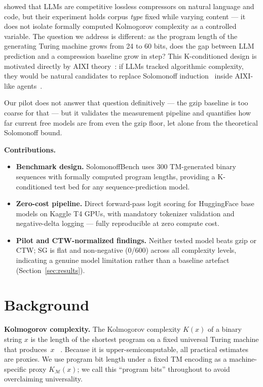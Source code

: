\documentclass{article}
\begin{document}
\citet{deletang2023language} showed that LLMs are competitive lossless
compressors on natural language and code, but their experiment holds
corpus \emph{type} fixed while varying content — it does not isolate
formally computed Kolmogorov complexity as a controlled variable.
The question we address is different: as the program length of the
generating Turing machine grows from 24 to 60 bits, does the gap between
LLM prediction and a compression baseline grow in step?
This K-conditioned design is motivated directly by AIXI
theory~\citep{hutter2000aixi,hutter2007universal}: if LLMs tracked
algorithmic complexity, they would be natural candidates to replace
Solomonoff induction~\citep{solomonoff1964formal} inside AIXI-like
agents~\citep{legg2007universal}.

Our pilot does not answer that question definitively — the gzip baseline
is too coarse for that — but it validates the measurement pipeline and
quantifies how far current free models are from even the gzip floor,
let alone from the theoretical Solomonoff bound.

\textbf{Contributions.}
\begin{itemize}
  \item \textbf{Benchmark design.}
        SolomonoffBench uses 300 TM-generated binary sequences with formally
        computed program lengths, providing a K-conditioned test bed for any
        sequence-prediction model.
  \item \textbf{Zero-cost pipeline.}
        Direct forward-pass logit scoring for HuggingFace base models on
        Kaggle T4 GPUs, with mandatory tokenizer validation and negative-delta
        logging — fully reproducible at zero compute cost.
  \item \textbf{Pilot and CTW-normalized findings.}
        Neither tested model beats gzip or CTW; SG is flat and non-negative
        (0/600) across all complexity levels, indicating a genuine model
        limitation rather than a baseline artefact (Section~\ref{sec:results}).
\end{itemize}

\section{Background}
\label{sec:background}

\textbf{Kolmogorov complexity.}
The Kolmogorov complexity $K(x)$ of a binary string $x$ is the length of the
shortest program on a fixed universal Turing machine that produces~$x$~%
\citep{li2008vitanyi}.
Because it is upper-semicomputable, all practical estimates are proxies.
We use program bit length under a fixed TM encoding as a machine-specific
proxy $K_{\mathcal{M}}(x)$; we call this ``program bits'' throughout to avoid
overclaiming universality.
\end{document}
